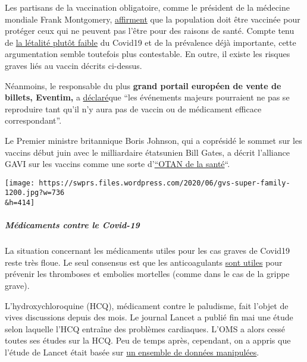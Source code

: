 Les partisans de la vaccination obligatoire, comme le président de la
médecine mondiale Frank Montgomery,
\href{https://www.n-tv.de/panorama/Weltaerztepraesident-fordert-Impfpflicht-article21793158.html}{affirment}
que la population doit être vaccinée pour protéger ceux qui ne peuvent
pas l'être pour des raisons de santé. Compte tenu de
\href{https://swprs.org/studies-on-covid-19-lethality/}{la létalité
plutôt faible} du Covid19 et de la prévalence déjà importante, cette
argumentation semble toutefois plus contestable. En outre, il existe les
risques graves liés au vaccin décrits ci-dessus.

Néanmoins, le responsable du plus \textbf{grand portail européen de
vente de billets, Eventim,} a
\href{https://www.n-tv.de/mediathek/audio/Ohne-Impfstoff-keine-Konzerte-article21821926.html}{déclaré}que
``les événements majeurs pourraient ne pas se reproduire tant qu'il n'y
aura pas de vaccin ou de médicament efficace correspondant''.

Le Premier ministre britannique Boris Johnson, qui a coprésidé le sommet
sur les vaccins début juin avec le milliardaire étatsunien Bill Gates, a
décrit l'alliance GAVI sur les vaccins comme une sorte
d'\href{https://www.youtube.com/watch?v=1S0LAbObZV0}{``OTAN de la
santé}``.

\texttt{[image: https://swprs.files.wordpress.com/2020/06/gvs-super-family-1200.jpg?w=736\\\&h=414]}

\hypertarget{muxe9dicaments-contre-le-covid-19}{%
\subparagraph{\texorpdfstring{\textbf{Médicaments contre le
Covid-19}}{Médicaments contre le Covid-19}}\label{muxe9dicaments-contre-le-covid-19}}

La situation concernant les médicaments utiles pour les cas graves de
Covid19 reste très floue. Le seul consensus est que les anticoagulants
\href{https://www.webmd.com/lung/news/20200506/blood-thinners-could-boost-covid19-survival}{sont
utiles} pour prévenir les thromboses et embolies mortelles (comme dans
le cas de la grippe grave).

L'hydroxychloroquine (HCQ), médicament contre le paludisme, fait l'objet
de vives discussions depuis des mois. Le journal Lancet a publié fin mai
une étude selon laquelle l'HCQ entraîne des problèmes cardiaques. L'OMS
a alors cessé toutes ses études sur la HCQ. Peu de temps après,
cependant, on a appris que l'étude de Lancet était basée sur
\href{https://www.theguardian.com/world/2020/jun/03/covid-19-surgisphere-who-world-health-organization-hydroxychloroquine}{un
ensemble de données manipulées}.

